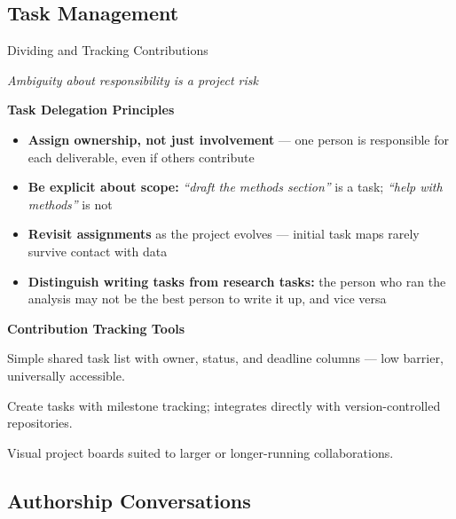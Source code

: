 \documentclass{beamer}
\begin{document}
\subsection{Task Management}
\begin{frame}{Dividing and Tracking Contributions}

  \footnotesize
  \begin{center}
    \emph{Ambiguity about responsibility is a project risk}
  \end{center}

  \textbf{Task Delegation Principles}
  \begin{itemize}
    \item \textbf{Assign ownership, not just involvement} ---
      one person is responsible for each deliverable, even
      if others contribute
    \item \textbf{Be explicit about scope:} \textit{``draft
      the methods section''} is a task;
      \textit{``help with methods''} is not
    \item \textbf{Revisit assignments} as the project evolves ---
      initial task maps rarely survive contact with data
    \item \textbf{Distinguish writing tasks from research tasks:}
      the person who ran the analysis may not be the best person
      to write it up, and vice versa
  \end{itemize}

  \medskip
  \textbf{Contribution Tracking Tools}
  \begin{description}
    \setlength{\itemsep}{3pt}
    \item[\textbf{Google Sheets}]
      Simple shared task list with owner, status, and
      deadline columns --- low barrier, universally accessible.
    \item[\textbf{GitHub Issues}]
      Create tasks with milestone tracking;
      integrates directly with version-controlled repositories.
    \item[\textbf{Asana/Trello/Notion}]
      Visual project boards suited to larger or
      longer-running collaborations.
  \end{description}

\end{frame}

\subsection{Authorship Conversations}
\end{document}
